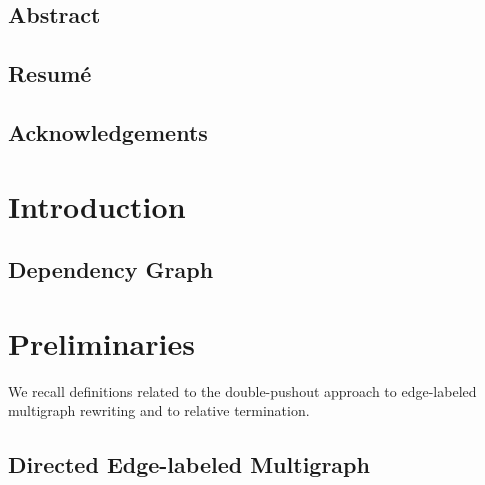 \documentclass{report}
\begin{document}
  
   
  
 
\newpage
\section*{Abstract}

 
\newpage  
\section*{Resumé}
  
  
\newpage  
\section*{Acknowledgements} 

\newpage       
  
  
\tableofcontents   
\newpage      

\chapter{Introduction}  

\section{Dependency Graph}

\chapter{Preliminaries}
\label{chap:preliminaries}
We recall definitions related to the double-pushout approach to edge-labeled multigraph rewriting and to relative termination. 
% 
\section{Directed Edge-labeled Multigraph} 
\label{Preliminaries:Graphs}
 
\end{document}
